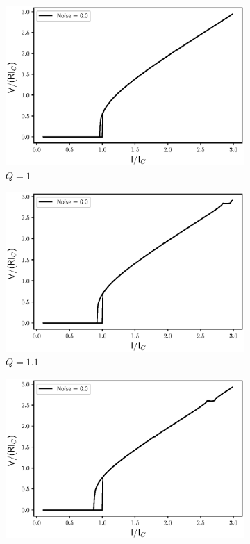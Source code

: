 \documentclass{thesis}
\begin{document}
\begin{figure}[H]
    \centering
    \begin{subfigure}[b]{0.32\textwidth}
        \centering
        \includegraphics[width=\textwidth]{images/Q_1var.eps}
        \caption{$Q=1$}
    \end{subfigure}
    \hfill
    \begin{subfigure}[b]{0.32\textwidth}
        \centering
        \includegraphics[width=\textwidth]{images/Q_1.1var.eps}
        \caption{$Q=1.1$}
    \end{subfigure}
    \hfill
    \begin{subfigure}[b]{0.32\textwidth}
        \centering
        \includegraphics[width=\textwidth]{images/Q_1.2var.eps}

\end{subfigure}
\end{figure}
\end{document}
